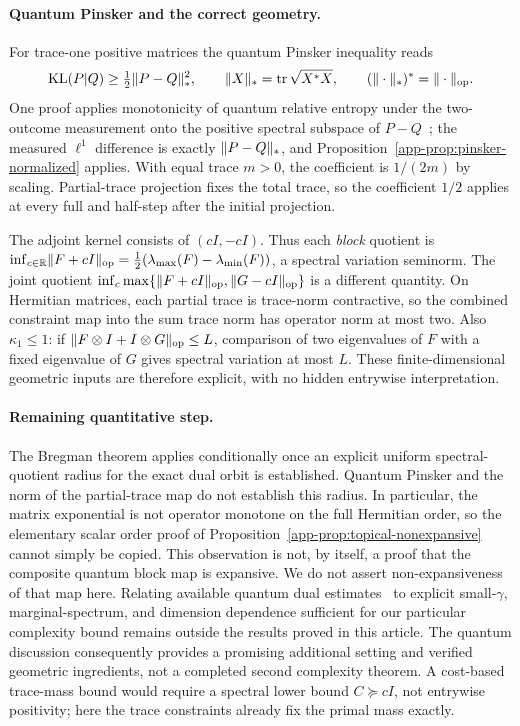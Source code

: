 \paragraph{Quantum Pinsker and the correct geometry.}
For trace-one positive matrices the quantum Pinsker inequality reads
\begin{equation}\label{eq:quantum-pinsker}
 \mathrm{KL}(P|Q)\geq\tfrac12\lVert P-Q\rVert_*^2,\qquad
 \lVert X\rVert_*=\operatorname{tr}\sqrt{X^*X},\qquad
 (\|\cdot\|_*)^*=\|\cdot\|_{\rm op}.
\end{equation}
One proof applies monotonicity of quantum relative entropy under the two-outcome measurement onto the positive spectral subspace of $P-Q$~\citep{hiai1981sufficiency,watrous2018theory}; the measured $\ell^1$ difference is exactly $\lVert P-Q\rVert_*$, and Proposition~\ref{app-prop:pinsker-normalized} applies. With equal trace $m>0$, the coefficient is $1/(2m)$ by scaling. Partial-trace projection fixes the total trace, so the coefficient $1/2$ applies at every full and half-step after the initial projection.

The adjoint kernel consists of $(cI,-cI)$. Thus each \emph{block} quotient is
$\inf_{c\in\mathbb R}\lVert F+cI\rVert_{\mathrm{op}}=\tfrac12(\lambda_{\max}(F)-\lambda_{\min}(F))$, a spectral variation seminorm. The joint quotient $\inf_c\max\{\lVert F+cI\rVert_{\mathrm{op}},\lVert G-cI\rVert_{\mathrm{op}}\}$ is a different quantity. On Hermitian matrices, each partial trace is trace-norm contractive, so the combined constraint map into the sum trace norm has operator norm at most two. Also $\kappa_1\leq1$: if $\lVert F\otimes I+I\otimes G\rVert_{\mathrm{op}}\leq L$, comparison of two eigenvalues of $F$ with a fixed eigenvalue of $G$ gives spectral variation at most $L$. These finite-dimensional geometric inputs are therefore explicit, with no hidden entrywise interpretation.

\paragraph{Remaining quantitative step.}
The Bregman theorem applies conditionally once an explicit uniform spectral-quotient radius for the exact dual orbit is established. Quantum Pinsker and the norm of the partial-trace map do not establish this radius. In particular, the matrix exponential is not operator monotone on the full Hermitian order, so the elementary scalar order proof of Proposition~\ref{app-prop:topical-nonexpansive} cannot simply be copied. This observation is not, by itself, a proof that the composite quantum block map is expansive. We do not assert non-expansiveness of that map here. Relating available quantum dual estimates~\citep{feliciangeli2021noncommutative} to explicit small-$\gamma$, marginal-spectrum, and dimension dependence sufficient for our particular complexity bound remains outside the results proved in this article. The quantum discussion consequently provides a promising additional setting and verified geometric ingredients, not a completed second complexity theorem. A cost-based trace-mass bound would require a spectral lower bound $C\succeq cI$, not entrywise positivity; here the trace constraints already fix the primal mass exactly.
